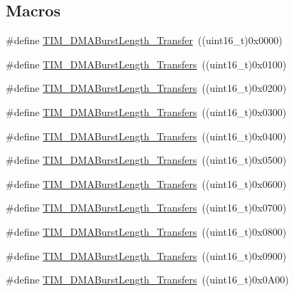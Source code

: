 \subsection*{Macros}
\begin{DoxyCompactItemize}
\item 
\#define \hyperlink{group___t_i_m___d_m_a___burst___length_gab87f91f1c5583b9888cb6bb37fc639e2}{T\+I\+M\+\_\+\+D\+M\+A\+Burst\+Length\+\_\+Transfer}~((uint16\+\_\+t)0x0000)
\item 
\#define \hyperlink{group___t_i_m___d_m_a___burst___length_ga829504c3e8c90a9445f6a223bc3034f8}{T\+I\+M\+\_\+\+D\+M\+A\+Burst\+Length\+\_\+Transfers}~((uint16\+\_\+t)0x0100)
\item 
\#define \hyperlink{group___t_i_m___d_m_a___burst___length_ga3a99863a0925e0cc9a11b91aade66f11}{T\+I\+M\+\_\+\+D\+M\+A\+Burst\+Length\+\_\+Transfers}~((uint16\+\_\+t)0x0200)
\item 
\#define \hyperlink{group___t_i_m___d_m_a___burst___length_ga84bfeb309593a1ac580e233bf7514b36}{T\+I\+M\+\_\+\+D\+M\+A\+Burst\+Length\+\_\+Transfers}~((uint16\+\_\+t)0x0300)
\item 
\#define \hyperlink{group___t_i_m___d_m_a___burst___length_ga44f8aa51fbe8887a5f3c37a0e776902c}{T\+I\+M\+\_\+\+D\+M\+A\+Burst\+Length\+\_\+Transfers}~((uint16\+\_\+t)0x0400)
\item 
\#define \hyperlink{group___t_i_m___d_m_a___burst___length_ga8be40a21654eea72e9c1bf9922675b22}{T\+I\+M\+\_\+\+D\+M\+A\+Burst\+Length\+\_\+Transfers}~((uint16\+\_\+t)0x0500)
\item 
\#define \hyperlink{group___t_i_m___d_m_a___burst___length_gaf2ae83bd73b0e92b73e5ebfc11f9bfad}{T\+I\+M\+\_\+\+D\+M\+A\+Burst\+Length\+\_\+Transfers}~((uint16\+\_\+t)0x0600)
\item 
\#define \hyperlink{group___t_i_m___d_m_a___burst___length_ga8a760d7114425596736b0ecdbe5fdea6}{T\+I\+M\+\_\+\+D\+M\+A\+Burst\+Length\+\_\+Transfers}~((uint16\+\_\+t)0x0700)
\item 
\#define \hyperlink{group___t_i_m___d_m_a___burst___length_ga98b208205c133557a9d67a0921559a66}{T\+I\+M\+\_\+\+D\+M\+A\+Burst\+Length\+\_\+Transfers}~((uint16\+\_\+t)0x0800)
\item 
\#define \hyperlink{group___t_i_m___d_m_a___burst___length_ga2fc09f2148cf6ebddc8e67116212259c}{T\+I\+M\+\_\+\+D\+M\+A\+Burst\+Length\+\_\+Transfers}~((uint16\+\_\+t)0x0900)
\item 
\#define \hyperlink{group___t_i_m___d_m_a___burst___length_ga0ca63a3caeaf1e85bd54961891949de7}{T\+I\+M\+\_\+\+D\+M\+A\+Burst\+Length\+\_\+Transfers}~((uint16\+\_\+t)0x0\+A00)

\end{DoxyCompactItemize}
